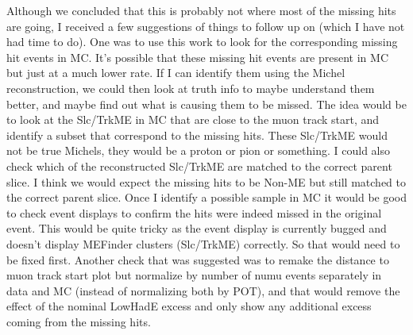 \documentclass{article}
\begin{document}
Although we concluded that this is probably not where most of the missing hits are going, I received a few suggestions of things to follow up on (which I have not had time to do). One was to use this work to look for the corresponding missing hit events in MC. It's possible that these missing hit events are present in MC but just at a much lower rate. If I can identify them using the Michel reconstruction, we could then look at truth info to maybe understand them better, and maybe find out what is causing them to be missed. The idea would be to look at the Slc/TrkME in MC that are close to the muon track start, and identify a subset that correspond to the missing hits. These Slc/TrkME would not be true Michels, they would be a proton or pion or something. I could also check which of the reconstructed Slc/TrkME are matched to the correct parent slice. I think we would expect the missing hits to be Non-ME but still matched to the correct parent slice. Once I identify a possible sample in MC it would be good to check event displays to confirm the hits were indeed missed in the original event. This would be quite tricky as the event display is currently bugged and doesn't display MEFinder clusters (Slc/TrkME) correctly. So that would need to be fixed first. Another check that was suggested was to remake the distance to muon track start plot but normalize by number of numu events separately in data and MC (instead of normalizing both by POT), and that would remove the effect of the nominal LowHadE excess and only show any additional excess coming from the missing hits. 




\end{document}
